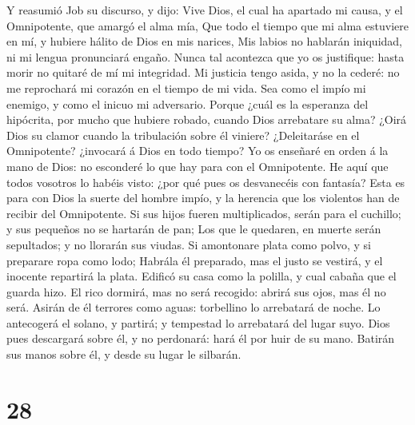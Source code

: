  Y reasumió Job su discurso, y dijo:  Vive
Dios, el cual ha apartado mi causa, y el Omnipotente, que amargó el alma
mía,  Que todo el tiempo que mi alma estuviere en mí, y
hubiere hálito de Dios en mis narices,  Mis labios no
hablarán iniquidad, ni mi lengua pronunciará engaño. 
Nunca tal acontezca que yo os justifique: hasta morir no quitaré de mí
mi integridad.  Mi justicia tengo asida, y no la cederé:
no me reprochará mi corazón en el tiempo de mi vida.  Sea
como el impío mi enemigo, y como el inicuo mi adversario. 
Porque ¿cuál es la esperanza del hipócrita, por mucho que hubiere
robado, cuando Dios arrebatare su alma?  ¿Oirá Dios su
clamor cuando la tribulación sobre él viniere? 
¿Deleitaráse en el Omnipotente? ¿invocará á Dios en todo tiempo?
 Yo os enseñaré en orden á la mano de Dios: no esconderé
lo que hay para con el Omnipotente.  He aquí que todos
vosotros lo habéis visto: ¿por qué pues os desvanecéis con fantasía?
 Esta es para con Dios la suerte del hombre impío, y la
herencia que los violentos han de recibir del Omnipotente.
 Si sus hijos fueren multiplicados, serán para el
cuchillo; y sus pequeños no se hartarán de pan;  Los que
le quedaren, en muerte serán sepultados; y no llorarán sus viudas.
 Si amontonare plata como polvo, y si preparare ropa como
lodo;  Habrála él preparado, mas el justo se vestirá, y
el inocente repartirá la plata.  Edificó su casa como la
polilla, y cual cabaña que el guarda hizo.  El rico
dormirá, mas no será recogido: abrirá sus ojos, mas él no será.
 Asirán de él terrores como aguas: torbellino lo
arrebatará de noche.  Lo antecogerá el solano, y partirá;
y tempestad lo arrebatará del lugar suyo.  Dios pues
descargará sobre él, y no perdonará: hará él por huir de su mano.
 Batirán sus manos sobre él, y desde su lugar le
silbarán.

\hypertarget{section-27}{%
\section{28}\label{section-27}}


